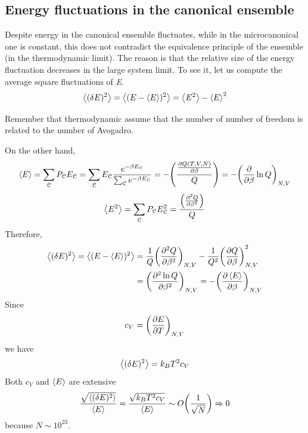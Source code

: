 \documentclass[../../Main/Main.tex]{subfiles}
\begin{document}
\subsection{Energy fluctuations in the canonical ensemble}
Despite energy in the canonical ensemble fluctuates, while in the microcanonical one is constant, this does not contradict the equivalence principle of the ensemble (in the thermodynamic limit). The reason is that the relative size of the energy fluctuation decreases in the large system limit. 
To see it, let us compute the average square fluctuations of \emph{E}.
\begin{equation}
\expval{(\delta E)^2} = \expval{(E- \expval{E} )^2} = \expval{E^2} - \expval{E}^2
\end{equation}
\begin{remark}
Remember that thermodynamic assume that the number of number of freedom is related to the number of Avogadro.
\end{remark}
On the other hand,
\begin{equation*}
  \expval{E} = \sum_{\mathcal{C}}^{} P_{\mathcal{C}} E_{\mathcal{C}} = \sum_{\mathcal{C}}^{} E_{\mathcal{C}} \frac{e^{-\beta E_{\mathcal{C}}} }{\sum_{\mathcal{C}}^{} e^{-\beta E_{\mathcal{C}}}  }
   = - \qty( \frac{\pdv{Q (T,V,N)}{\beta }}{Q} ) = - \qty(\pdv{}{\beta } \ln{Q})_{N,V}
\end{equation*}
\begin{equation*}
  \expval{E^2} = \sum_{\mathcal{C}}^{} P_{\mathcal{C}} E_{\mathcal{C}}^2 = \frac{\qty(\pdv[2]{Q}{\beta } )}{Q}
\end{equation*}
Therefore,
\begin{equation*}
\begin{split}
  \expval{(\delta E)^2} = \expval{(E- \expval{E} )^2}  &= \frac{1}{Q} \qty(\pdv[2]{Q}{\beta } )_{N,V} - \frac{1}{Q^2} \qty(\pdv{Q}{\beta } )^2_{N,V}\\
  & =  \qty( \pdv[2]{\ln{Q} }{\beta} )_{N,V} = - \qty(\pdv{\expval{E} }{\beta } )_{N,V}
\end{split}
\end{equation*}
Since
\begin{equation}
  c_V = \qty(\pdv{E}{T} )_{N,V}
\end{equation}
we have
\begin{equation}
  \expval{(\delta E)^2} = k_B T^2 c_V
\end{equation}
Both \( c_V \) and \( \expval{E}  \) are extensive
\begin{equation*}
  \frac{\sqrt{\expval{(\delta E)^2} } }{\expval{E} } = \frac{\sqrt{k_B T^2 c_V} }{\expval{E} } \sim O \qty(\frac{1}{\sqrt{N} }) \Rightarrow 0
\end{equation*}
because \( N \sim 10^{23} \).
\end{document}
